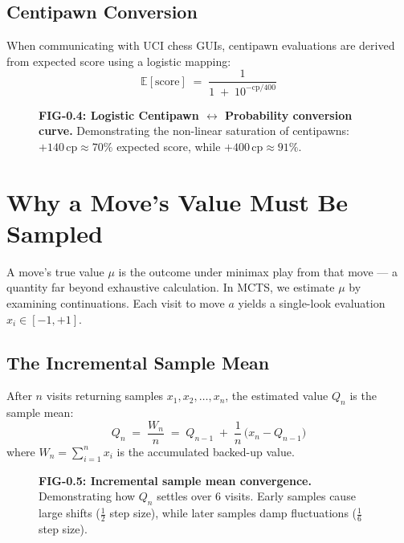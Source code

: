 \subsection{Centipawn Conversion}

When communicating with UCI chess GUIs, centipawn evaluations are derived from expected score using a logistic mapping:
\begin{equation}
\label{eq:E3}
\boxed{\;\mathbb{E}[\text{score}] \;=\; \frac{1}{1 \;+\; 10^{-\text{cp}/400}}\;}
\end{equation}

\begin{figure}[htbp]
\centering

\caption{\textbf{FIG-0.4: Logistic Centipawn $\leftrightarrow$ Probability conversion curve.} Demonstrating the non-linear saturation of centipawns: $+140\,\text{cp} \approx 70\%$ expected score, while $+400\,\text{cp} \approx 91\%$.}
\label{fig:0_4}
\end{figure}

\section{Why a Move's Value Must Be Sampled}
\label{sec:0_4}

A move's true value $\mu$ is the outcome under minimax play from that move --- a quantity far beyond exhaustive calculation. In MCTS, we estimate $\mu$ by examining continuations. Each visit to move $a$ yields a single-look evaluation $x_i \in [-1, +1]$.

\subsection{The Incremental Sample Mean}

After $n$ visits returning samples $x_1, x_2, \dots, x_n$, the estimated value $Q_n$ is the sample mean:
\begin{equation}
\label{eq:E4}
\boxed{\;Q_n \;=\; \frac{W_n}{n} \;=\; Q_{n-1} \;+\; \frac{1}{n}\,\bigl(x_n - Q_{n-1}\bigr)\;}
\end{equation}
where $W_n = \sum_{i=1}^n x_i$ is the accumulated backed-up value.

\begin{figure}[htbp]
\centering

\caption{\textbf{FIG-0.5: Incremental sample mean convergence.} Demonstrating how $Q_n$ settles over 6 visits. Early samples cause large shifts ($\frac{1}{2}$ step size), while later samples damp fluctuations ($\frac{1}{6}$ step size).}
\label{fig:0_5}
\end{figure}

